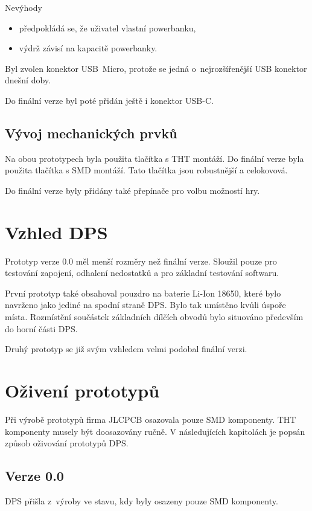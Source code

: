   Nevýhody
  \begin{itemize}
    \item předpokládá se, že uživatel vlastní powerbanku,
    \item výdrž závisí na kapacitě powerbanky. 
  \end{itemize}

  Byl zvolen konektor USB~Micro, protože se jedná o~nejrozšířenější USB konektor dnešní doby.

  Do finální verze byl poté přidán ještě i konektor USB-C.

  \subsection{Vývoj mechanických prvků}
  Na obou prototypech byla použita tlačítka s THT montáží. Do finální verze byla použita tlačítka s SMD montáží. Tato tlačítka jsou 
  robustnější a celokovová. 

  Do finální verze byly přidány také přepínače pro volbu možností hry. 

  \section{Vzhled DPS}
  Prototyp verze 0.0 měl menší rozměry než finální verze. Sloužil pouze pro testování zapojení, odhalení nedostatků a pro základní testování
  softwaru. 

  První prototyp také obsahoval pouzdro na baterie Li-Ion 18650, které bylo navrženo jako jediné na spodní straně DPS. Bylo tak umístěno
  kvůli úspoře místa. Rozmístění součástek základních dílčích obvodů bylo situováno především do horní části DPS. 

  Druhý prototyp se již svým vzhledem velmi podobal finální verzi.
  
  \section{Oživení prototypů}
  Při výrobě prototypů firma JLCPCB osazovala pouze SMD komponenty. THT komponenty musely být doosazovány ručně. V následujících kapitolách
  je popsán způsob oživování prototypů DPS.

  \subsection{Verze 0.0}
  DPS přišla z~výroby ve stavu, kdy byly osazeny pouze SMD komponenty.

